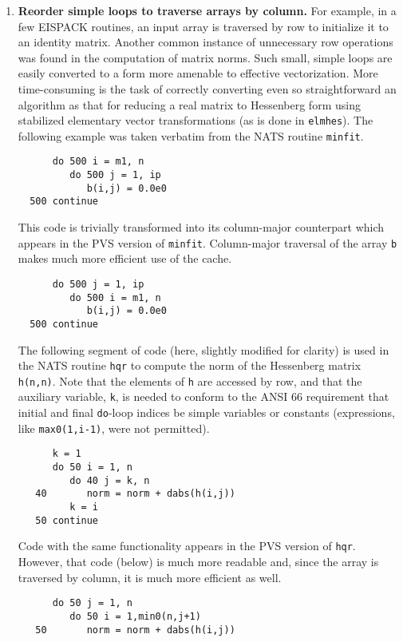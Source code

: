 \begin{enumerate}
 \item {\bf Reorder simple loops to traverse arrays by column.}  For example,
 in a few EISPACK routines, an input array is traversed by row to
 initialize it to an identity matrix.  Another common instance of
 unnecessary row operations was found in the computation of matrix
 norms.  Such small, simple loops are easily converted to a form more
 amenable to effective vectorization.  More time-consuming is the task
 of correctly converting even so straightforward an algorithm as that
 for reducing a real matrix to Hessenberg form using stabilized elementary
 vector transformations (as is done in {\tt elmhes}).
 The following example was taken verbatim from the NATS routine {\tt minfit}.
\begin{verbatim}
      do 500 i = m1, n
         do 500 j = 1, ip
            b(i,j) = 0.0e0
  500 continue
\end{verbatim}

This code is trivially transformed into its column-major counterpart
 which appears in the PVS version of {\tt minfit}.  Column-major traversal
 of the array {\tt b} makes much more efficient use of the cache.
\begin{verbatim}
      do 500 j = 1, ip
         do 500 i = m1, n
            b(i,j) = 0.0e0
  500 continue
\end{verbatim}

The following segment of code (here, slightly modified for clarity) is used
in the NATS routine {\tt hqr} to compute the norm of the Hessenberg
matrix {\tt h(n,n)}.  Note that the elements of {\tt h} are accessed by
row, and that the auxiliary variable, {\tt k}, is needed to conform to
the ANSI 66 requirement that initial and final {\tt do}-loop indices be
simple variables or constants (expressions, like {\tt max0(1,i-1)},
were not permitted).

\begin{verbatim}
      k = 1
      do 50 i = 1, n
         do 40 j = k, n
   40       norm = norm + dabs(h(i,j))
         k = i
   50 continue
\end{verbatim}

Code with the same functionality appears in the PVS version of {\tt hqr}.
However, that code (below) is much more readable and, since the array is
traversed by column, it is much more efficient as well.
\begin{verbatim}
      do 50 j = 1, n
         do 50 i = 1,min0(n,j+1)
   50       norm = norm + dabs(h(i,j))
\end{verbatim}


\end{enumerate}
